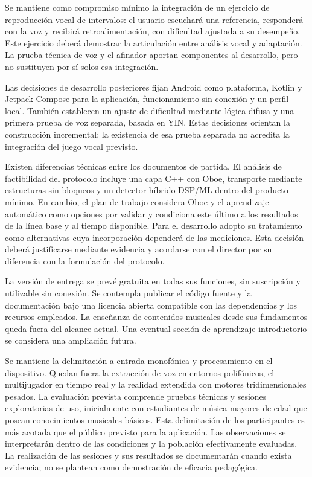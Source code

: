 Se mantiene como compromiso mínimo la integración de un ejercicio de reproducción vocal
de intervalos: el usuario escuchará una referencia, responderá con la voz y recibirá
retroalimentación, con dificultad ajustada a su desempeño. Este ejercicio deberá
demostrar la articulación entre análisis vocal y adaptación. La prueba técnica de voz
y el afinador aportan componentes al desarrollo, pero no sustituyen por sí solos esa
integración.

Las decisiones de desarrollo posteriores fijan Android como plataforma, Kotlin y Jetpack
Compose para la aplicación, funcionamiento sin conexión y un perfil local. También
establecen un ajuste de dificultad mediante lógica difusa y una primera prueba de voz
separada, basada en YIN. Estas decisiones orientan la construcción incremental; la
existencia de esa prueba separada no acredita la integración del juego vocal previsto.

Existen diferencias técnicas entre los documentos de partida. El análisis de factibilidad
del protocolo incluye una capa C++ con Oboe, transporte mediante estructuras sin bloqueos
y un detector híbrido DSP/ML dentro del producto mínimo. En cambio, el plan de trabajo
considera Oboe y el aprendizaje automático como opciones por validar y condiciona este
último a los resultados de la línea base y al tiempo disponible. Para el desarrollo
adopto su tratamiento como alternativas cuya incorporación dependerá de las mediciones.
Esta decisión deberá justificarse mediante evidencia y
acordarse con el director por su diferencia con la formulación del protocolo.

La versión de entrega se prevé gratuita en todas sus funciones, sin suscripción y
utilizable sin conexión. Se contempla publicar el código fuente y la documentación
bajo una licencia abierta compatible con las dependencias y los recursos empleados.
La enseñanza de contenidos musicales desde sus fundamentos queda fuera del alcance
actual. Una eventual sección de aprendizaje introductorio se considera una ampliación
futura.

Se mantiene la delimitación a entrada monofónica y procesamiento en el dispositivo.
Quedan fuera la extracción de voz en entornos polifónicos, el multijugador en tiempo real
y la realidad extendida con motores tridimensionales pesados. La evaluación prevista
comprende pruebas técnicas y sesiones exploratorias de uso, inicialmente con estudiantes
de música mayores de edad que posean conocimientos musicales básicos. Esta delimitación
de los participantes es más acotada que el público previsto para la aplicación. Las
observaciones se interpretarán dentro de las condiciones y la población efectivamente
evaluadas. La realización de las sesiones y sus resultados se documentarán cuando
exista evidencia; no se plantean como demostración de eficacia pedagógica.

